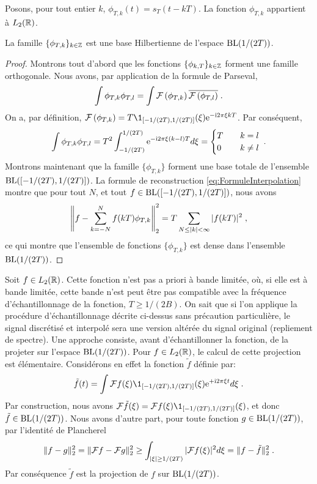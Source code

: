 Posons, pour tout entier $k$, $\phi_{T,k}(t) = s_T(t- k T)$. La fonction $\phi_{T,k}$ appartient {\`a} $L_2(\mathbb{R})$.
\begin{proposition}
\label{prop:SincBH}
La famille $\{ \phi_{T,k} \}_{k \in \mathbb{Z}}$ est une base Hilbertienne de l'espace $\mathrm{BL}(1/(2T))$.
\end{proposition}
\begin{proof}
Montrons tout d'abord que les fonctions $\{ \phi_{k,T} \}_{k \in \mathbb{Z}}$ forment une famille orthogonale. Nous avons, par application de la formule
de Parseval,
$$
\int \phi_{T,k} \phi_{T,l} = \int \mathcal{F}\left( \phi_{T,k} \right) \overline{\mathcal{F}\left( \phi_{T,l} \right)} \;.
$$
On a, par d{\'e}finition, $\TFA{\phi_{T,k}}= T \1_{[-1/(2T),1/(2T)]}(\xi) \rme^{- \rmi 2 \pi \xi k T}$. Par cons{\'e}quent,
$$
\int \phi_{T,k} \phi_{T,l} = T^2 \int_{-1/(2T)}^{1/(2T)} \mathrm{e}^{- \mathrm{i} 2 \pi \xi (k-l) T} d \xi = \begin{cases} T & \quad k = l \\ 0 & \quad k \ne l \end{cases} \;.
$$
Montrons maintenant que la famille $\{ \phi_{T,k} \}$ forment une
base totale de l'ensemble $\mathrm{BL}([-1/(2T),1/(2T)])$. La formule de reconstruction \eqref{eq:FormuleInterpolation} montre que pour tout $N$,
et tout $f \in \mathrm{BL}([-1/(2T),1/(2T)])$, nous avons
$$
\left \| f - \sum_{k=-N}^N f(kT) \phi_{T,k}  \right \|_2^2 = T \sum_{N \leq |k| < \infty} |f(kT)|^2 \;,
$$
ce qui montre que l'ensemble de fonctions $\{ \phi_{T,k} \}$ est dense dans l'ensemble $\mathrm{BL}(1/(2T))$.
\end{proof}
Soit $f \in L_2(\mathbb{R})$. Cette fonction n'est pas a priori {\`a} bande limit{\'e}e, o{\`u}, si elle est {\`a} bande limit{\'e}e, cette bande
n'est peut {\^e}tre pas compatible avec la fr{\'e}quence d'{\'e}chantillonnage de la fonction, $T \geq 1/(2B)$. On sait que si l'on applique
la proc{\'e}dure d'{\'e}chantillonnage d{\'e}crite ci-dessus sans pr{\'e}caution particuli{\`e}re, le signal discr{\'e}tis{\'e} et interpol{\'e} sera une version alt{\'e}r{\'e}e
du signal original (repliement de spectre). Une approche consiste, avant d'{\'e}chantillonner la fonction, de la projeter sur l'espace
$\mathrm{BL}(1/(2T))$. Pour $f \in L_2(\mathbb{R})$, le calcul de cette projection est {\'e}l{\'e}mentaire. Consid{\'e}rons en effet la fonction $\tilde{f}$ d{\'e}finie
par:
$$
\tilde{f}(t) = \int \TF f (\xi)  \1_{[-1/(2T),1/(2T)]}(\xi) \rme^{+ \rmi 2 \pi \xi t} d \xi \eqsp.
$$
Par construction, nous avons $\TF \tilde{f} (\xi) = \TF f (\xi)  \1_{[-1/(2T),1/(2T)]}(\xi)$, et donc $\tilde{f} \in \mathrm{BL}(1/(2T))$.
Nous avons d'autre part, pour toute fonction $g \in \mathrm{BL}(1/(2T))$, par l'identit{\'e} de Plancherel
$$
\| f - g \|_2^2 = \| \mathcal{F} f - \mathcal{F} g \|_2^2 \geq \int_{|\xi| \geq 1/(2T)} | \mathcal{F} f (\xi)|^2 d \xi = \| f - \tilde{f} \|_2^2 \;.
$$
Par cons{\'e}quence $\tilde{f}$ est la projection de $f$ sur $\mathrm{BL}(1/(2T))$.


